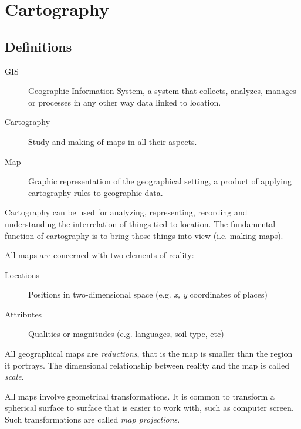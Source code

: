\documentclass[letterpaper]{article}
\begin{document}


\section{Cartography}
\label{sec:cartography}

\subsection{Definitions}
\label{sec:definitions}

\begin{description}
\item[GIS] Geographic Information System, a system that collects, analyzes, manages or processes in any other way data linked to location.
\item[Cartography] Study and making of maps in all their aspects.
\item[Map] Graphic representation of the geographical setting, a product of applying cartography rules to geographic data.
\end{description}

Cartography can be used for analyzing, representing, recording and understanding the interrelation of things tied to location. The fundamental function of cartography is to bring those things into view (i.e. making maps).

All maps are concerned with two elements of reality:
\begin{description}
\item[Locations] Positions in two-dimensional space (e.g. \textit{x, y} coordinates of places)
\item[Attributes] Qualities or magnitudes (e.g. languages, soil type, etc)
\end{description}

All geographical maps are \emph{reductions}, that is the map is smaller than the region it portrays.
The dimensional relationship between reality and the map is called \emph{scale}.

All maps involve geometrical transformations.
It is common to transform a spherical surface to surface that is easier to work with, such
as computer screen. Such transformations are called \emph{map projections}.
\end{document}
